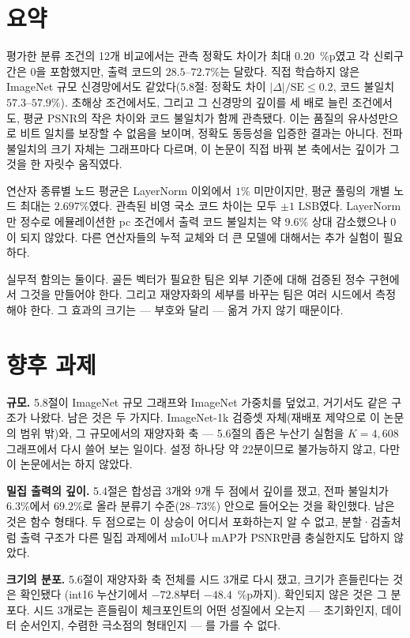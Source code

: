 \documentclass[11pt,a4paper,oneside]{report}
\begin{document}
\section{요약}

평가한 분류 조건의 12개 비교에서는 관측 정확도 차이가 최대 $0.20$~\%p였고 각 신뢰구간은
0을 포함했지만, 출력 코드의 $28.5$--$72.7\%$는 달랐다. 직접 학습하지 않은 ImageNet 규모 신경망에서도
같았다(5.8절: 정확도 차이 $|\Delta|/\mathrm{SE} \le 0.2$, 코드 불일치 $57.3$--$57.9\%$). 초해상 조건에서도, 그리고 그 신경망의
깊이를 세 배로 늘린 조건에서도, 평균 PSNR의 작은 차이와 코드 불일치가 함께 관측됐다. 이는 품질의
유사성만으로 비트 일치를 보장할 수 없음을 보이며, 정확도 동등성을 입증한 결과는 아니다.
전파 불일치의 크기 자체는 그래프마다 다르며, 이 논문이 직접 바꿔 본 축에서는 깊이가 그것을 한
자릿수 움직였다.

연산자 종류별 노드 평균은 LayerNorm 이외에서 $1\%$ 미만이지만, 평균 풀링의 개별 노드
최대는 $2.697\%$였다. 관측된 비영 국소 코드 차이는 모두 $\pm1$ LSB였다. LayerNorm만
정수로 에뮬레이션한 pc 조건에서 출력 코드 불일치는 약 $9.6\%$ 상대 감소했으나 0이 되지 않았다.
다른 연산자들의 누적 교체와 더 큰 모델에 대해서는 추가 실험이 필요하다.

실무적 함의는 둘이다. 골든 벡터가 필요한 팀은 외부 기준에 대해 검증된 정수 구현에서 그것을 만들어야 한다.
그리고 재양자화의 세부를 바꾸는 팀은 여러 시드에서 측정해야 한다. 그 효과의 크기는 --- 부호와 달리 ---
옮겨 가지 않기 때문이다.

\section{향후 과제}

\textbf{규모.} 5.8절이 ImageNet 규모 그래프와 ImageNet 가중치를 덮었고, 거기서도 같은 구조가 나왔다.
남은 것은 두 가지다. ImageNet-1k 검증셋 자체(재배포 제약으로 이 논문의 범위 밖)와, 그 규모에서의 재양자화
축 --- 5.6절의 좁은 누산기 실험을 $K = 4{,}608$ 그래프에서 다시 쓸어 보는 일이다. 설정 하나당 약 22분이므로
불가능하지 않고, 다만 이 논문에서는 하지 않았다.

\textbf{밀집 출력의 깊이.} 5.4절은 합성곱 3개와 9개 두 점에서 깊이를 쟀고, 전파 불일치가 $6.3\%$에서
$69.2\%$로 올라 분류기 수준($28$--$73\%$) 안으로 들어오는 것을 확인했다. 남은 것은 함수 형태다. 두 점으로는
이 상승이 어디서 포화하는지 알 수 없고, 분할·검출처럼 출력 구조가 다른 밀집 과제에서 mIoU나 mAP가 PSNR만큼
충실한지도 답하지 않았다.

\textbf{크기의 분포.} 5.6절이 재양자화 축 전체를 시드 3개로 다시 쟀고, 크기가 흔들린다는 것은 확인됐다
(int16 누산기에서 $-72.8$부터 $-48.4$~\%p까지). 확인되지 않은 것은 그 분포다. 시드 3개로는 흔들림이
체크포인트의 어떤 성질에서 오는지 --- 초기화인지, 데이터 순서인지, 수렴한 극소점의 형태인지 --- 를 가를 수
없다.
\end{document}
